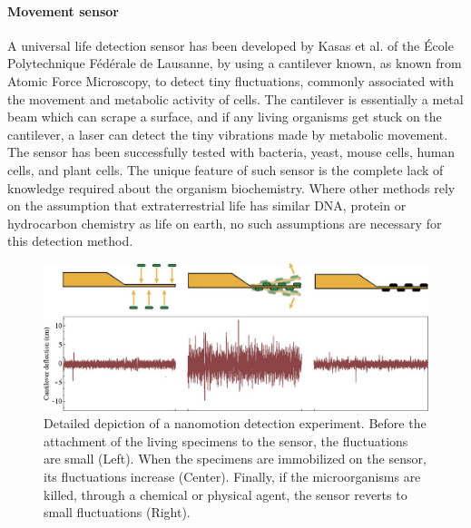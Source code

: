 \paragraph{Movement sensor \cite{Kasas13012015}}
A universal life detection sensor has been developed by Kasas et al. of the École Polytechnique Fédérale de Lausanne, by using a cantilever known, as known from Atomic Force Microscopy, to detect tiny fluctuations, commonly associated with the movement and metabolic activity of cells. The cantilever is essentially a metal beam which can scrape a surface, and if any living organisms get stuck on the cantilever, a laser can detect the tiny vibrations made by metabolic movement. The sensor has been successfully tested with bacteria, yeast, mouse cells, human cells, and plant cells. The unique feature of such sensor is the complete lack of knowledge required about the organism biochemistry. Where other methods rely on the assumption that extraterrestrial life has similar DNA, protein or hydrocarbon chemistry as life on earth, no such assumptions are necessary for this detection method.
\begin{figure}[htb]
	\centering
	\includegraphics[width=\textwidth]{figures/mlh/movementdetector.jpg}
	\caption{Detailed depiction of a nanomotion detection experiment. Before the attachment of the living specimens to the sensor, the fluctuations are small (Left). When the specimens are immobilized on the sensor, its fluctuations increase (Center). Finally, if the microorganisms are killed, through a chemical or physical agent, the sensor reverts to small fluctuations (Right).}
	\label{fig:movementdetector}
\end{figure}

